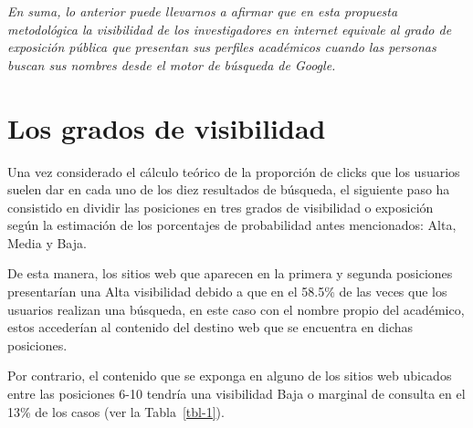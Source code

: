 \documentclass[
  spanish,
  11pt,
  a4paper,
]{scrbook}
\begin{document}
\emph{En suma, lo anterior puede llevarnos a afirmar que en esta
propuesta metodológica la visibilidad de los investigadores en internet
equivale al grado de exposición pública que presentan sus perfiles
académicos cuando las personas buscan sus nombres desde el motor de
búsqueda de Google.}

\section*{Los grados de visibilidad}\label{los-grados-de-visibilidad}


Una vez considerado el cálculo teórico de la proporción de clicks que
los usuarios suelen dar en cada uno de los diez resultados de búsqueda,
el siguiente paso ha consistido en dividir las posiciones en tres grados
de visibilidad o exposición según la estimación de los porcentajes de
probabilidad antes mencionados: Alta, Media y Baja.

De esta manera, los sitios web que aparecen en la primera y segunda
posiciones presentarían una Alta visibilidad debido a que en el 58.5\%
de las veces que los usuarios realizan una búsqueda, en este caso con el
nombre propio del académico, estos accederían al contenido del destino
web que se encuentra en dichas posiciones.

Por contrario, el contenido que se exponga en alguno de los sitios web
ubicados entre las posiciones 6-10 tendría una visibilidad Baja o
marginal de consulta en el 13\% de los casos (ver la Tabla~\ref{tbl-1}).

\newpage

\begingroup
\scriptsize
\end{document}
